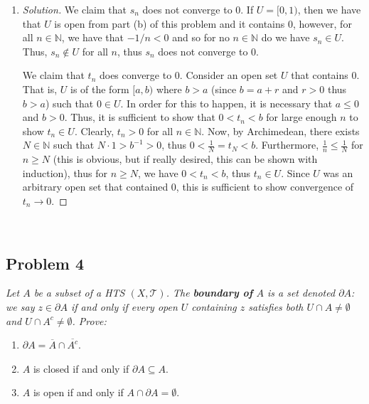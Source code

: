 \documentclass{article}
\newcommand{\N}{{\mathbb N}}
\newcommand{\R}{{\mathbb R}}
\begin{document}
\begin{enumerate}
\begin{proof}[Solution]
		We now show that there are no more boundary points of the set.
		Let $x \in \R$ and $x \neq 0$.
		If $x < 0$, the open set $[x,0)$ contains $x$ but does not
		intersect $(0,1)$, so cannot be a boundary point for it.
		If $x \in (0,1)$, then $[x,1)$ contains $x$ but does not intersect $(0,1)^c$,
		so cannot be a boundary point for $(0,1)$.
		And if $x \geq 1$, then $[x,x+1)$ contains $x$ but does not
		intersect $(0,1)$ so cannot be a boundary point for it.
		Thus, since $x$ was arbitrary, $x \in \R^*$ cannot be a boundary point for $(0,1)$.
	\end{proof}
	\item \begin{proof}[Solution]\let\qed\relax
		We claim that $s_n$ does not converge to $0$.
		If $U = [0, 1)$,
		then we have that $U$ is open from part (b) of this problem
		and it contains $0$,
		however, for all $n \in \N$, we have that $-1/n < 0$ and so
		for no $n \in \N$ do we have $s_n \in U$.
		Thus, $s_n \not\in U$ for all $n$, thus $s_n$ does not converge to $0$.

		We claim that $t_n$ does converge to $0$.
		Consider an open set $U$ that contains $0$.
		That is, $U$ is of the form $[a,b)$ where $b > a$
		(since $b = a+r$ and $r>0$ thus $b>a$)
		such that $0 \in U$.
		In order for this to happen, it is necessary that $a \leq 0$ and $b > 0$.
		Thus, it is sufficient to show that $0 < t_n < b$ for large enough $n$
		to show $t_n \in U$.
		Clearly, $t_n > 0$ for all $n \in \N$.
		Now, by Archimedean, there exists $N \in \N$ such that $N\cdot 1 > b^{-1}>0$,
		thus $0 < \frac{1}{N} = t_N < b$.
		Furthermore, $\frac{1}{n} \leq \frac{1}{N}$ for $n \geq N$
		(this is obvious, but if really desired, this can be shown with induction),
		thus for $n \geq N$, we have $0 < t_n < b$, thus $t_n \in U$.
		Since $U$ was an arbitrary open set that contained $0$,
		this is sufficient to show convergence of $t_n \to 0$.
	\end{proof}
\end{enumerate}
\clearpage
~\clearpage

\subsection*{Problem 4}
{\it Let $A$ be a subset of a HTS $(X,\mathcal{T})$.
The \textbf{boundary of} $A$ is a set denoted $\partial A$:
we say $z \in \partial A$ if and only if every open $U$ containing $z$
satisfies both $U \cap A \neq \emptyset$ and $U \cap A^c \neq \emptyset$. Prove:}
\begin{enumerate}
	\item $\partial A = \overline{A} \cap \overline{A^c}$.
	\item $A$ is closed if and only if $\partial A \subseteq A$.
	\item $A$ is open if and only if $A \cap \partial A = \emptyset$.
\end{enumerate}
\end{document}
